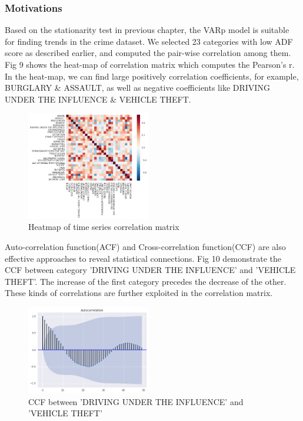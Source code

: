 \documentclass[11pt,conference]{IEEEtran}
\begin{document}
\subsubsection{Motivations}
Based on the stationarity test in previous chapter, the VAR{p} model is suitable for finding trends in the crime dataset. We selected 23 categories with low ADF score as described earlier,  and computed the pair-wise correlation among them. Fig 9 shows the heat-map of correlation matrix which computes the Pearson's r. In the heat-map, we can find large positively correlation coefficients, for example, BURGLARY \& ASSAULT, as well as negative coefficients like DRIVING UNDER THE INFLUENCE \& VEHICLE THEFT.
\begin{figure}[h]
\begin{center}
\includegraphics [width=0.48\textwidth]{pics/heat_map_time_series.png}
\caption{Heatmap of time series correlation matrix }
\end{center}
\end{figure}
Auto-correlation function(ACF) and Cross-correlation function(CCF) are also effective approaches to reveal statistical connections. Fig 10 demonstrate the CCF between category 'DRIVING UNDER THE INFLUENCE' and 'VEHICLE THEFT'. The increase of the first category precedes the decrease of the other. These kinds of correlations are further exploited in the correlation matrix.
\begin{figure}[H]
\begin{center}
\includegraphics [width=0.48\textwidth]{pics/ccf_DRIVING_UNDER_THE_INFLUENCE_VEHICLE_THEFT.png}
\caption{CCF between 'DRIVING UNDER THE INFLUENCE' and 'VEHICLE THEFT'}
\end{center}
\end{figure}
\end{document}
